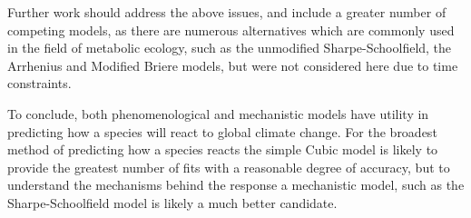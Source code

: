 \documentclass[11pt]{article}
\begin{document}
Further work should address the above issues, and include a greater number of competing models, as there are numerous alternatives which are commonly used in the field of metabolic ecology, such as the unmodified Sharpe-Schoolfield, the Arrhenius and Modified Briere models, but were not considered here due to time constraints. 

To conclude, both phenomenological and mechanistic models have utility in predicting how a species will react to global climate change. For the broadest method of predicting how a species reacts the simple Cubic model is likely to provide the greatest number of fits with a reasonable degree of accuracy, but to understand the mechanisms behind the response a mechanistic model, such as the Sharpe-Schoolfield model is likely a much better candidate. 




\end{document}
